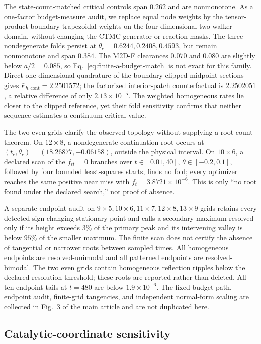 \documentclass[aps,pre,reprint,amsmath,amssymb,longbibliography,floatfix]{revtex4-2}
\begin{document}
The state-count-matched critical controls span \(0.262\) and are nonmonotone.
As a one-factor budget-measure audit, we replace equal node weights by the
tensor-product boundary trapezoidal weights on the four-dimensional
two-walker domain, without changing the CTMC generator or reaction masks.
The three nondegenerate folds persist at
\(\theta_c=0.6244,0.2408,0.4593\), but remain nonmonotone and span \(0.384\).
The M2D-F clearances \(0.070\) and \(0.080\) are slightly below
\(a/2=0.085\), so Eq.~\eqref{eq:finite-a-budget-match} is not exact for this
family. Direct one-dimensional quadrature of the boundary-clipped midpoint
sections gives \(\bar\kappa_{h,\mathrm{cont}}=2.2501572\); the factorized
interior-patch counterfactual is \(2.2502051\), a relative difference of only
\(2.13\times10^{-5}\). The weighted homogeneous rates lie closer to the
clipped reference, yet their fold sensitivity confirms that neither sequence
estimates a continuum critical value.

The two even grids clarify the observed topology without supplying a
root-count theorem. On \(12\times8\), a nondegenerate continuation root occurs
at \((t_c,\theta_c)=(18.26877,-0.06158)\), outside the physical interval.
On \(10\times6\), a declared scan of the \(f_{tt}=0\) branches over
\(t\in[0.01,40]\), \(\theta\in[-0.2,0.1]\), followed by four bounded
least-squares starts, finds no fold; every optimizer reaches the same positive
near miss with \(f_t=3.8721\times10^{-6}\). This is only ``no root found under
the declared search,'' not proof of absence.

A separate endpoint audit on
\(9\times5,10\times6,11\times7,12\times8,13\times9\) grids retains every
detected sign-changing stationary point and calls a secondary maximum
resolved only if its height exceeds \(3\%\) of the primary peak and its
intervening valley is below \(95\%\) of the smaller maximum. The finite scan
does not certify the absence of tangential or narrower roots between sampled
times. All homogeneous endpoints are
resolved-unimodal and all patterned endpoints are resolved-bimodal. The two
even grids contain homogeneous reflection ripples below the declared
resolution threshold; these roots are reported rather than deleted. All ten
endpoint tails at \(t=480\) are below \(1.9\times10^{-6}\).
The fixed-budget path, endpoint audit, finite-grid tangencies, and independent
normal-form scaling are collected in Fig.~3 of the main article and are not
duplicated here.

\subsection{Catalytic-coordinate sensitivity}
\label{sec:2d-coordinate-sensitivity}
\end{document}
